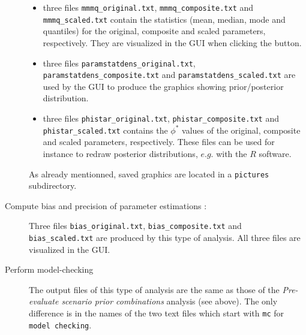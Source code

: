 \begin{description}
\begin{itemize}
\item three files \texttt{mmmq\_original.txt}, \texttt{mmmq\_composite.txt}
and \texttt{mmmq\_scaled.txt} contain the statistics (mean, median,
mode and quantiles) for the original, composite and scaled parameters,
respectively. They are visualized in the GUI when clicking the  button.
\item three files \texttt{paramstatdens\_original.txt}, \texttt{paramstatdens\_composite.txt}
and \texttt{paramstatdens\_scaled.txt} are used by the GUI to produce
the graphics showing prior/posterior distribution.
\item three files \texttt{phistar\_original.txt}, \texttt{phistar\_composite.txt}
and \texttt{phistar\_scaled.txt} contains the $\phi^{*}$ values of
the original, composite and scaled parameters, respectively. These
files can be used for instance to redraw posterior distributions,
$e.g.$ with the $R$ software.
\end{itemize}

As already mentionned, saved graphics are located in a \texttt{pictures}
subdirectory.

\item [{Compute bias and precision of parameter estimations :}] Three
files \texttt{bias\_original.txt}, \texttt{bias\_composite.txt} and
\texttt{bias\_scaled.txt} are produced by this type of analysis. All
three files are visualized in the GUI.
\item [{Perform model-checking}] The output files of this type of analysis
are the same as those of the \textit{Pre-evaluate scenario prior combinations}
analysis (see above). The only difference is in the names of the two
text files which start with \texttt{mc} for \texttt{model checking}.
\end{description}
~\\


